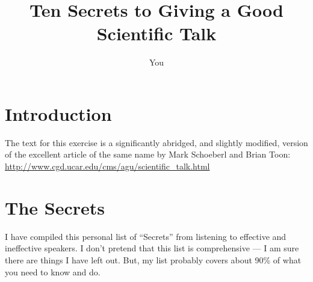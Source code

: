 \documentclass[12pt]{article}
\title{Ten Secrets to Giving a Good Scientific Talk}
\author{You}
\begin{document}
\maketitle

\section{Introduction}

The text for this exercise is a significantly abridged, and slightly modified, version of the excellent article of the same name by Mark Schoeberl and Brian Toon:
\url{http://www.cgd.ucar.edu/cms/agu/scientific_talk.html}

\section{The Secrets}

I have compiled this personal list of ``Secrets'' from listening to effective and ineffective speakers. I don't pretend that this list is comprehensive --- I am sure there are things I have left out. But, my list probably covers about 90\% of what you need to know and do.
\end{document}
